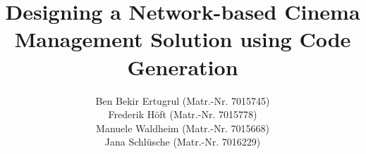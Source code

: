 \documentclass[praxisarbeit,english,oneside]{framework/hgbthesis}
\begin{document}

\title{Designing a Network-based Cinema Management Solution using Code Generation}
\prueferBack{} %
\author{{Ben Bekir Ertugrul (Matr.-Nr. 7015745)\texorpdfstring{\\}{ }Frederik Höft (Matr.-Nr. 7015778)\texorpdfstring{\\}{ }Manuele Waldheim (Matr.-Nr. 7015668)\texorpdfstring{\\}{ }Jana Schlüsche (Matr.-Nr. 7016229)}\texorpdfstring{\\}{ }}
\authorstreet{}
\authortown{}

\frontmatter
\maketitle



\listoftodos %




\inhaltsverzeichnis

\mainmatter         %









\lists
\listoflistings
{}

\printnoidxglossary[type=\acronymtype, sort=word]
\printnoidxglossary[sort=word]

\MakeBibliography %

\appendixpage

%

%
%
%
\end{document}
